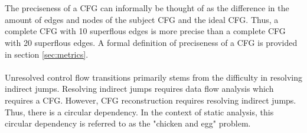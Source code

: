 \documentclass{kththesis}
\begin{document}
\\ \\
The preciseness of a CFG can informally be thought of as the difference in the amount of edges and nodes of the subject CFG and the ideal CFG. Thus, a complete CFG with 10 superflous edges is more precise than a complete CFG with 20 superflous edges. A formal definition of preciseness of a CFG is provided in section \ref{sec:metrics}.
\\ \\
Unresolved control flow transitions primarily stems from the difficulty in resolving indirect jumps. Resolving indirect jumps requires data flow analysis which requires a CFG. However, CFG reconstruction requires resolving indirect jumps. Thus, there is a circular dependency. In the context of static analysis, this circular dependency is referred to as the "chicken and egg" problem\cite{Jakstab}.

%
%
%
\end{document}
